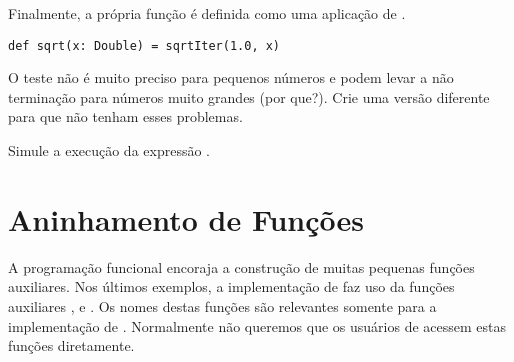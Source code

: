 Finalmente, a pr\'{o}pria fun\c{c}\~{a}o  \'{e} definida como uma aplica\c{c}\~{a}o de
.
  
\begin{lstlisting}
def sqrt(x: Double) = sqrtIter(1.0, x)
\end{lstlisting}


\begin{exercise} O teste  n\~{a}o \'{e} muito preciso para pequenos 
n\'{u}meros e podem levar a n\~{a}o termina\c{c}\~{a}o para n\'{u}meros muito grandes (por que?).
Crie uma vers\~{a}o diferente para  que n\~{a}o tenham esses problemas.
\end{exercise}

\begin{exercise} Simule a execu\c{c}\~{a}o da express\~{a}o .
\end{exercise}


\section{Aninhamento de Fun\c{c}\~{o}es}

A programa\c{c}\~{a}o funcional encoraja a constru\c{c}\~{a}o de muitas pequenas fun\c{c}\~{o}es
auxiliares. Nos \'{u}ltimos exemplos, a implementa\c{c}\~{a}o de  faz uso da
fun\c{c}\~{o}es auxiliares ,  e .
Os nomes destas fun\c{c}\~{o}es s\~{a}o relevantes somente para a implementa\c{c}\~{a}o de 
. Normalmente n\~{a}o queremos que os usu\'{a}rios de  acessem
estas fun\c{c}\~{o}es diretamente.  

